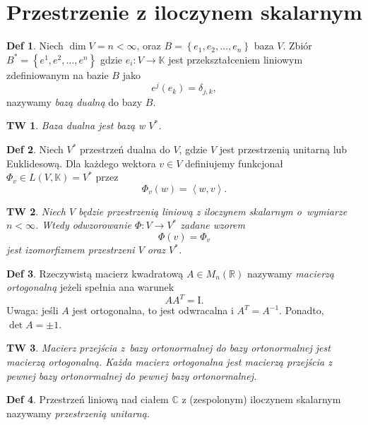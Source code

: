 \documentclass[a4paper, 12pt]{mwart}
\newcommand*{\im}{\mathrm{I}}
\theoremstyle{definition}
\newtheorem{definicja}{Def}[section]
\theoremstyle{plain}
\newtheorem{twierdzenie}{TW}[section]
\theoremstyle{remark}
\begin{document}
\section{Przestrzenie z iloczynem skalarnym}
\begin{definicja}
	Niech $\dim V = n < \infty$, oraz $B = \left\{e_1, e_2, \ldots, e_n\right\}$ \ppauza baza $V$. Zbiór $B^* = \left\{e^1, e^2, \ldots, e^n\right\}$ gdzie $e_i\colon V\to\mathbb{K}$ jest przekształceniem liniowym zdefiniowanym na bazie $B$ jako
	\begin{equation}
		e^j(e_k) = \delta_{j, k},
	\end{equation}
	nazywamy \emph{bazą dualną} do bazy $B$.
\end{definicja}
\begin{twierdzenie}
	Baza dualna jest bazą w $V^*$.
\end{twierdzenie}
\begin{definicja}
	Niech $V^*$ \ppauza przestrzeń dualna do $V$, gdzie $V$ jest przestrzenią unitarną lub Euklidesową. Dla każdego wektora $v\in V$ definiujemy funkcjonał $\Phi_v \in L(V, \mathbb{K}) = V^*$ przez
	\begin{equation}
		\Phi_v(w) = \left<w, v\right>.
	\end{equation}
\end{definicja}
\begin{twierdzenie}
	Niech $V$ będzie przestrzenią liniową z iloczynem skalarnym o~wymiarze $n < \infty$. Wtedy odwzorowanie $\Phi\colon V\to V^*$ zadane wzorem
	\begin{equation}
		\Phi(v) = \Phi_v
	\end{equation}
	jest izomorfizmem przestrzeni $V$ oraz $V^*$.
\end{twierdzenie}
\begin{definicja}
	Rzeczywistą macierz kwadratową $A \in M_n(\mathbb{R})$ nazywamy \emph{macierzą ortogonalną} jeżeli spełnia ana warunek
	\begin{equation}
		AA^T = \im.
	\end{equation}
	Uwaga: jeśli $A$ jest ortogonalna, to jest odwracalna i $A^T = A^{-1}$. Ponadto, $\det A = \pm 1$.
\end{definicja}
\begin{twierdzenie}
	Macierz przejścia z~bazy ortonormalnej do bazy ortonormalnej jest macierzą ortogonalną. Każda macierz ortogonalna jest macierzą przejścia z pewnej bazy ortonormalnej do pewnej bazy ortonormalnej.
\end{twierdzenie}
\begin{definicja}
	Przestrzeń liniową nad ciałem $\mathbb{C}$ z (zespolonym) iloczynem skalarnym nazywamy \emph{przestrzenią unitarną}.
\end{definicja}
\end{document}
